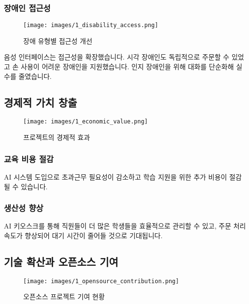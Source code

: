 \subsubsection{장애인 접근성}

\begin{figure}[H]
    \centering
    \texttt{[image: images/1\_disability\_access.png]}
    \caption{장애 유형별 접근성 개선}
    \label{fig:disability_access}
\end{figure}

음성 인터페이스는 접근성을 확장했습니다. 시각 장애인도 독립적으로 주문할 수 있었고 손 사용이 어려운 장애인을 지원했습니다. 인지 장애인을 위해 대화를 단순화해 실수를 줄였습니다.

\subsection{경제적 가치 창출}

\begin{figure}[H]
    \centering
    \texttt{[image: images/1\_economic\_value.png]}
    \caption{프로젝트의 경제적 효과}
    \label{fig:economic_value}
\end{figure}

\subsubsection{교육 비용 절감}

AI 시스템 도입으로 초과근무 필요성이 감소하고 학습 지원을 위한 추가 비용이 절감될 수 있습니다.

\subsubsection{생산성 향상}

AI 키오스크를 통해 직원들이 더 많은 학생들을 효율적으로 관리할 수 있고, 주문 처리 속도가 향상되어 대기 시간이 줄어들 것으로 기대됩니다.

\subsection{기술 확산과 오픈소스 기여}

\begin{figure}[H]
    \centering
    \texttt{[image: images/1\_opensource\_contribution.png]}
    \caption{오픈소스 프로젝트 기여 현황}
    \label{fig:opensource_contribution}
\end{figure}

